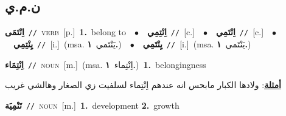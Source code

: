 \documentclass[10pt,a4paper,twoside]{article} %
\begin{document}
\begin{multicols}{2}
\vspace{-3mm}
\subsection*{\color{blue}\foreignlanguage{arabic}{ن.م.ي}\color{blue}{}} 

{\setlength\topsep{0pt}\textbf{\foreignlanguage{arabic}{اِنْتَمَى}}\ {\color{gray}\texttt{//}\color{black}}\ \textsc{verb}\ [p.]\ \textbf{1.}~belong to\ \ $\bullet$\ \ \setlength\topsep{0pt}\textbf{\foreignlanguage{arabic}{اِنْتِمِي}}\ {\color{gray}\texttt{//}\color{black}}\ [c.]\ \ $\bullet$\ \ \setlength\topsep{0pt}\textbf{\foreignlanguage{arabic}{اِنْتَمِي}}\ {\color{gray}\texttt{//}\color{black}}\ [c.]\ \ $\bullet$\ \ \setlength\topsep{0pt}\textbf{\foreignlanguage{arabic}{يِنْتِمِي}}\ {\color{gray}\texttt{//}\color{black}}\ [i.]\ \color{gray}(msa. \foreignlanguage{arabic}{يَنْتَمي}~\foreignlanguage{arabic}{\textbf{١.}})\color{black}\ \ $\bullet$\ \ \setlength\topsep{0pt}\textbf{\foreignlanguage{arabic}{يِنْتَمِي}}\ {\color{gray}\texttt{//}\color{black}}\ [i.]\ \color{gray}(msa. \foreignlanguage{arabic}{يَنْتَمي}~\foreignlanguage{arabic}{\textbf{١.}})\color{black}\ } \vspace{2mm}

{\setlength\topsep{0pt}\textbf{\foreignlanguage{arabic}{اِنْتِمَاء}}\ {\color{gray}\texttt{//}\color{black}}\ \textsc{noun}\ [m.]\ \color{gray}(msa. \foreignlanguage{arabic}{اِنْتِماء}~\foreignlanguage{arabic}{\textbf{١.}})\color{black}\ \textbf{1.}~belongingness\  \begin{flushright}\color{gray}\foreignlanguage{arabic}{\textbf{\underline{\foreignlanguage{arabic}{أمثلة}}}: ولادها الكبار مابحس انه عندهم اِنْتِماء لسلفيت زي الصغار وهالشي غريب}\end{flushright}\color{black}} \vspace{2mm}

{\setlength\topsep{0pt}\textbf{\foreignlanguage{arabic}{تَنْمِيَة}}\ {\color{gray}\texttt{//}\color{black}}\ \textsc{noun}\ [m.]\ \textbf{1.}~development  \textbf{2.}~growth\ } \vspace{2mm}


\end{multicols}
\end{document}
